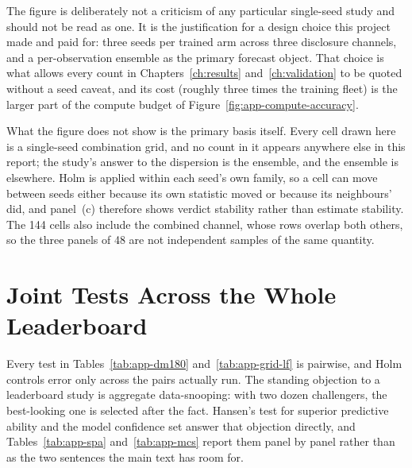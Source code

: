 The figure is deliberately not a criticism of any particular single-seed study
and should not be read as one. It is the justification for a design choice
this project made and paid for: three seeds per trained arm across three
disclosure channels, and a per-observation ensemble as the primary forecast
object. That choice is what allows every count in
Chapters~\ref{ch:results} and~\ref{ch:validation} to be quoted without a seed
caveat, and its cost (roughly three times the training fleet) is the
larger part of the compute budget of Figure~\ref{fig:app-compute-accuracy}.

What the figure does not show is the primary basis itself. Every cell drawn
here is a single-seed combination grid, and no count in it appears anywhere
else in this report; the study's answer to the dispersion is the ensemble, and
the ensemble is elsewhere. Holm is applied within each seed's own family, so a
cell can move between seeds either because its own statistic moved or because
its neighbours' did, and panel~(c) therefore shows verdict stability rather
than estimate stability. The 144 cells also include the combined channel,
whose rows overlap both others, so the three panels of 48 are not independent
samples of the same quantity.


\FloatBarrier
\section{Joint Tests Across the Whole Leaderboard}
\label{app:res-spamcs}

Every test in Tables~\ref{tab:app-dm180} and~\ref{tab:app-grid-lf} is
pairwise, and Holm controls error only across the pairs actually run. The
standing objection to a leaderboard study is aggregate data-snooping: with
two dozen challengers, the best-looking one is selected after the fact.
Hansen's test for superior predictive ability \cite{hansen2005spa} and the
model confidence set \cite{hansen2011mcs} answer that objection directly,
and Tables~\ref{tab:app-spa} and~\ref{tab:app-mcs} report them panel by
panel rather than as the two sentences the main text has room for.


